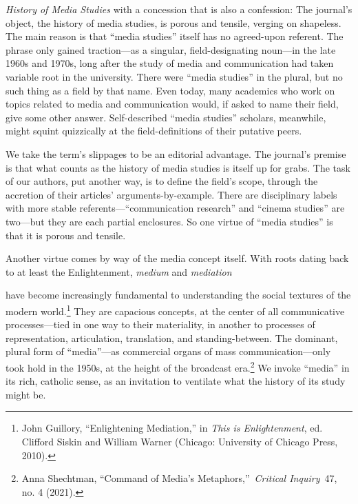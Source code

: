 \documentclass{tufte-handout}
\begin{document}
\begin{titlepage}
\vspace*{1em}


 \emph{History of Media Studies} with a concession that is also
a confession: The journal's object, the history of media studies, is
porous and tensile, verging on shapeless. The main reason is that
``media studies'' itself has no agreed-upon referent. The phrase only
gained traction---as a singular, field-designating noun---in the late
1960s and 1970s, long after the study of media and communication had
taken variable root in the university. There were ``media studies'' in
the plural, but no such thing as a field by that name. Even today, many
academics who work on topics related to media and communication would,
if asked to name their field, give some other answer. Self-described
``media studies'' scholars, meanwhile, might squint quizzically at the
field-definitions of their putative peers.

We take the term's slippages to be an editorial advantage. The journal's
premise is that what counts as the history of media studies is itself up
for grabs. The task of our authors, put another way, is to define the
field's scope, through the accretion of their articles'
arguments-by-example. There are disciplinary labels with more stable
referents---``communication research'' and ``cinema studies'' are
two---but they are each partial enclosures. So one virtue of ``media
studies'' is that it is porous and tensile.

Another virtue comes by way of the media concept itself. With roots
dating back to at least the Enlightenment, \emph{medium} and \emph{mediation}

\enlargethispage{2\baselineskip}

\vspace*{2em}



 \end{titlepage}


\noindent have become increasingly fundamental to understanding
the social textures of the modern
world.\footnote{John Guillory, ``Enlightening Mediation,'' in \emph{This is
  Enlightenment}, ed. \emph{} Clifford Siskin and William Warner
  (Chicago: University of Chicago Press, 2010).
} They are capacious
concepts, at the center of all communicative processes---tied in one way
to their materiality, in another to processes of representation,
articulation, translation, and standing-between. The dominant, plural
form of ``media''---as commercial organs of mass communication---only
took hold in the 1950s, at the height of the broadcast
era.\footnote{Anna Shechtman, ``Command of Media's Metaphors,''~\emph{Critical
  Inquiry}~47, no. 4 (2021).
} We invoke ``media'' in its
rich, catholic sense, as an invitation to ventilate what the history of
its study might be.
\end{document}
